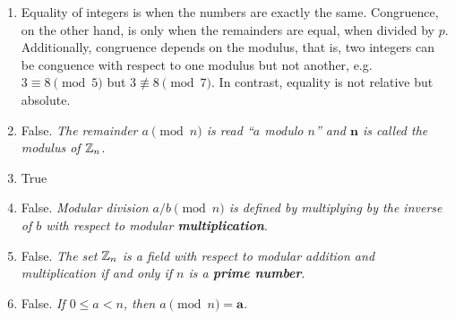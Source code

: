 
\begin{enumerate}[!HW!, start=1]
\item 
Equality of integers is when the numbers are exactly the same. Congruence, on the other hand, is only when the remainders are equal, when divided by $p$. Additionally, congruence depends on the modulus, that is, two integers can be conguence with respect to one modulus but not another, e.g. $3\equiv 8 \pmod 5$ but $3\not\equiv 8 \pmod 7$. In contrast, equality is not relative but absolute.%

\item False. \emph{The remainder $a\pmod n$ is read ``$a$ modulo $n$'' and $\boldsymbol n$ is called the modulus of $\mathbb{Z}_n$.} %
\item True %
\item False. \emph{Modular division $a/b\pmod n$ is defined by multiplying by the inverse of $b$ with respect to modular \textbf{multiplication}}. %
\item False. \emph{The set $\mathbb{Z}_n$ is a field with respect to modular addition and multiplication if and only if $n$ is a \textbf{prime number}}. %
\item False. \emph{If $0\le a< n$, then $a\pmod n=\boldsymbol a$.} %


\end{enumerate}
